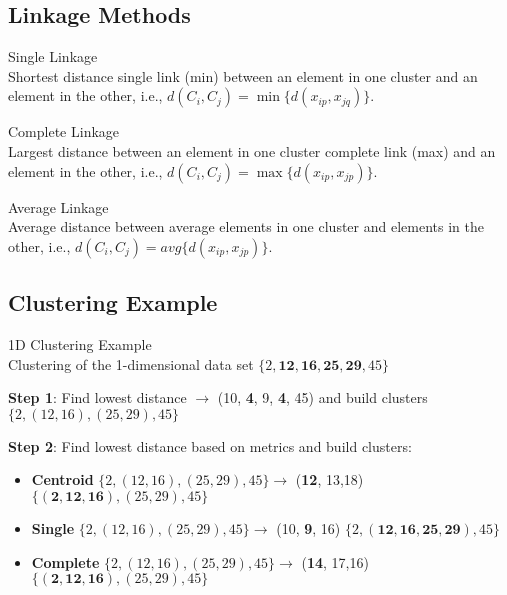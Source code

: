 
\subsection{Linkage Methods}

\begin{definition}{Single Linkage}\\
Shortest distance single link (min) between an element in one cluster and an element in the other, i.e., $d(C_i, C_j) = \min\{d(x_{ip}, x_{jq})\}$.
\end{definition}

\begin{definition}{Complete Linkage}\\
Largest distance between an element in one cluster complete link (max) and an element in the other, i.e., $d(C_i, C_j) = \max\{d(x_{ip}, x_{jp})\}$.
\end{definition}

\begin{definition}{Average Linkage}\\
Average distance between average elements in one cluster and elements in the other, i.e., $d(C_i, C_j) = avg\{d(x_{ip}, x_{jp})\}$.
\end{definition}

\subsection{Clustering Example}

\begin{example2}{1D Clustering Example}\\
Clustering of the 1-dimensional data set $\{2, \mathbf{12}, \mathbf{16}, \mathbf{25}, \mathbf{29}, 45\}$

\textbf{Step 1}: Find lowest distance $\rightarrow$ (10, \textbf{4}, 9, \textbf{4}, 45) and build clusters
$\{2, (12,16), (25,29), 45\}$

\textbf{Step 2}: Find lowest distance based on metrics and build clusters:
\begin{itemize}
    \item \textbf{Centroid} $\{2, (12,16), (25,29), 45\} \rightarrow$ (\textbf{12}, 13,18)
    $\{(\mathbf{2}, \mathbf{12}, \mathbf{16}), (25,29), 45\}$
    
    \item \textbf{Single} $\{2, (12,16), (25,29), 45\} \rightarrow$ (10, \textbf{9}, 16)
    $\{2, (\mathbf{12}, \mathbf{16}, \mathbf{25}, \mathbf{29}), 45\}$
    
    \item \textbf{Complete} $\{2, (12,16), (25,29), 45\} \rightarrow$ (\textbf{14}, 17,16)
    $\{(\mathbf{2}, \mathbf{12}, \mathbf{16}), (25,29), 45\}$
\end{itemize}
\end{example2}

